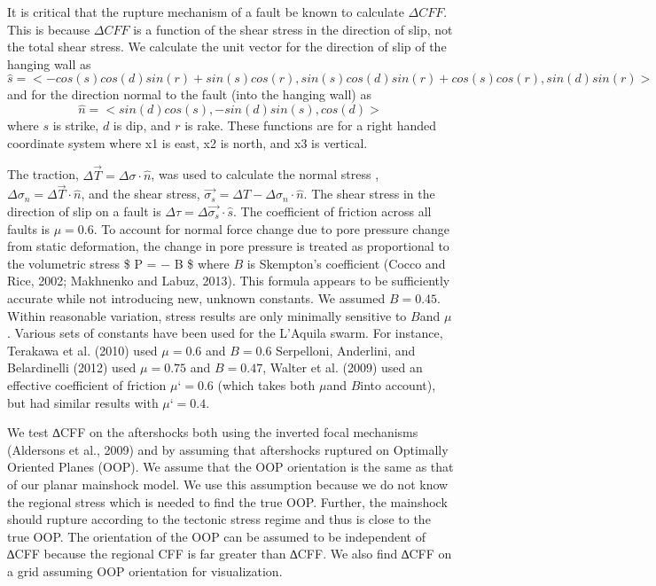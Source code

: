 \documentclass[11pt]{article}
\begin{document}
It is critical that the rupture mechanism of a fault be known to
calculate \(\Delta CFF\). This is because \(\Delta CFF\) is a function
of the shear stress in the direction of slip, not the total shear
stress. We calculate the unit vector for the direction of slip of the
hanging wall as
\[ \hat{s} = <−cos(s) cos(d) sin(r)+ sin(s) cos(r), sin(s) cos(d) sin(r)+cos(s) cos(r), sin(d) sin(r)> \]
and for the direction normal to the fault (into the hanging wall) as
\[\hat{n} = <sin(d) cos(s), −sin(d) sin(s), cos(d) > \] where \(s\) is
strike, \(d\) is dip, and \(r\) is rake. These functions are for a right
handed coordinate system where x1 is east, x2 is north, and x3 is
vertical.

The traction, \(\Delta\vec{T} = \Delta \sigma \cdot \hat{n}\), was used
to calculate the normal stress ,
\(\Delta \sigma_n = \Delta \vec{T} \cdot \hat{n}\), and the shear
stress, \(\vec{\sigma_s}=\Delta T − \Delta \sigma_n \cdot \hat{n}\). The
shear stress in the direction of slip on a fault is
\(\Delta \tau = \Delta \vec{\sigma_s} \cdot \hat{s}\). The coefficient
of friction across all faults is \(\mu = 0.6\). To account for normal
force change due to pore pressure change from static deformation, the
change in pore pressure is treated as proportional to the volumetric
stress \$ \Delta P = − B  \$ where
\(B\) is Skempton's coefficient (Cocco and Rice, 2002; Makhnenko and
Labuz, 2013). This formula appears to be sufficiently accurate while not
introducing new, unknown constants. We assumed \(B=0.45\). Within
reasonable variation, stress results are only minimally sensitive to
\(B\)and \(\mu\). Various sets of constants have been used for the
L'Aquila swarm. For instance, Terakawa et al. (2010) used \(\mu = 0.6\)
and \(B=0.6\) Serpelloni, Anderlini, and Belardinelli (2012) used
\(\mu = 0.75\) and \(B = 0.47\), Walter et al. (2009) used an effective
coefficient of friction \(\mu ‘ = 0.6\) (which takes both \(\mu\)and
\(B\)into account), but had similar results with \(\mu ‘ = 0.4\).

We test ∆CFF on the aftershocks both using the inverted focal mechanisms
(Aldersons et al., 2009) and by assuming that aftershocks ruptured on
Optimally Oriented Planes (OOP). We assume that the OOP orientation is
the same as that of our planar mainshock model. We use this assumption
because we do not know the regional stress which is needed to find the
true OOP. Further, the mainshock should rupture according to the
tectonic stress regime and thus is close to the true OOP. The
orientation of the OOP can be assumed to be independent of ∆CFF because
the regional CFF is far greater than ∆CFF. We also find ∆CFF on a grid
assuming OOP orientation for visualization.
\end{document}
